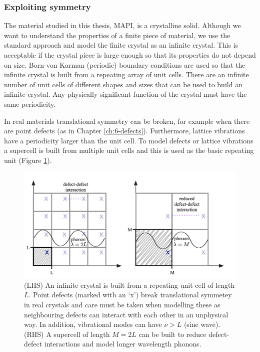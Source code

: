 \subsubsection{Exploiting symmetry}

The material studied in this thesis, MAPI, is a crystalline solid. Although we want to understand the properties of a finite piece of material, we use the standard approach and model the finite crystal as an infinite crystal. This is acceptable if the crystal piece is large enough so that its properties do not depend on size. Born-von Karman (periodic) boundary conditions are used so that the infinite crystal is built from a repeating array of unit cells. There are an infinite number of unit cells of different shapes and sizes that can be used to build an infinite crystal. Any physically significant function of the crystal must have the same periodicity.

In real materials translational symmetry can be broken, for example when there are point defects (as in Chapter \ref{ch:6-defects}). Furthermore, lattice vibrations have a periodicity larger than the unit cell. To model defects or lattice vibrations a supercell is built from multiple unit cells and this is used as the basic repeating unit (Figure \ref{translational}).

\begin{figure}[h]
\centering
  \includegraphics[width=0.8\columnwidth]{figures/ch3/supercell.png}
  \caption[Translational symmetry and supercell construction]{(LHS) An infinite crystal is built from a repeating unit cell of length $L$. Point defects (marked with an `x') break translational symmetey in real crystals and care must be taken when modelling these as neighbouring defects can interact with each other in an unphysical way. In addition, vibrational modes can have $\nu>L$ (sine wave). (RHS) A supercell of length $M=2L$ can be built to reduce defect-defect interactions and model longer wavelength phonons. } 
  \label{translational}
\end{figure}

